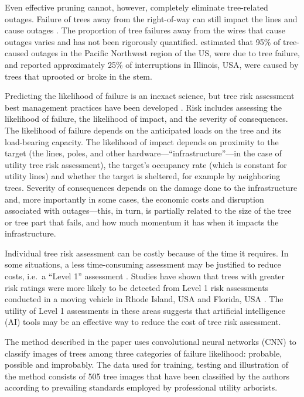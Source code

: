 \documentclass[11pt,twoside]{article}
\numberwithin{equation}{section}
\newcommand{\?}{\stackrel{?}{=}}
\begin{document}
Even effective pruning cannot, however, completely eliminate tree-related outages. Failure of trees away from the right-of-way can still impact the lines and cause outages \cite{guggenmoos2003effects}. The proportion of tree failures away from the wires that cause outages varies and has not been rigorously quantified. \citet{guggenmoos2011treerelated} estimated that 95\% of tree-caused outages in the Pacific Northwest region of the US, were due to tree failure, and \citet{wismer2018targeted} reported approximately 25\% of interruptions in Illinois, USA, were caused by trees that uprooted or broke in the stem. 


Predicting the likelihood of failure is an inexact science, but tree risk assessment best management practices have been developed \cite{e.thomassmiley2017best,johnw.goodfellow2020best}. Risk includes assessing the likelihood of failure, the likelihood of impact, and the severity of consequences. The likelihood of failure depends on the anticipated loads on the tree and its load-bearing capacity. The likelihood of impact depends on proximity to the target (the lines, poles, and other hardware---``infrastructure''---in the case of utility tree risk assessment), the target’s occupancy rate (which is constant for utility lines) and whether the target is sheltered, for example by neighboring trees. Severity of consequences depends on the damage done to the infrastructure and, more importantly in some cases, the economic costs and disruption associated with outages---this, in turn, is partially related to the size of the tree or tree part that fails, and how much momentum it has when it impacts the infrastructure.

Individual tree risk assessment can be costly because of the time it requires. In some situations, a less time-consuming assessment may be justified to reduce costs, i.e.\ a ``Level 1'' assessment  \cite{e.thomassmiley2017best}. Studies have shown that trees with greater risk ratings were more likely to be detected from Level 1 risk assessments conducted in a moving vehicle in Rhode Island, USA \cite{rooney2005reliability} and Florida, USA \cite{koeser2016frequency} . The utility of Level 1 assessments in these areas suggests that artificial intelligence (AI) tools may be an effective way to reduce the cost of tree risk assessment.

The method described in the paper uses convolutional neural networks (CNN) to classify images of trees among three categories of failure likelihood: probable, possible and improbably.  The data used for training, testing and illustration of the method consists of 505 tree images that have been classified by the authors according to prevailing standards employed by professional utility arborists. 
\end{document}
